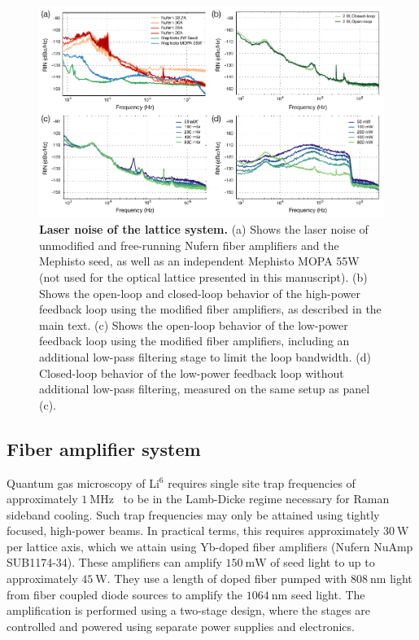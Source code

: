 \documentclass[twocolumn,aps,pra,showpacs,preprintnumbers,bibnotes]{revtex4-1}
\newcommand\unit[2]{\ensuremath{#1~\mathrm{{#2}}}}
\begin{document}
\begin{figure}
  \begin{center}
    \includegraphics{Figure2.pdf}
    \caption{\textbf{Laser noise of the lattice system.} (a) Shows the laser noise of unmodified and free-running Nufern fiber amplifiers and the Mephisto seed, as well as an independent Mephisto MOPA 55W (not used for the optical lattice presented in this manuscript). (b) Shows the open-loop and closed-loop behavior of the high-power feedback loop using the  modified fiber amplifiers, as described in the main text. (c) Shows the open-loop behavior of the low-power feedback loop using the modified fiber amplifiers, including an additional low-pass filtering stage to limit the loop bandwidth. (d) Closed-loop behavior of the low-power feedback loop without additional low-pass filtering, measured on the same setup as panel (c).}\label{fig:noises}
  \end{center}
\end{figure}

\subsection{Fiber amplifier system}
Quantum gas microscopy of Li$^6$ requires single site trap frequencies of approximately \unit{1}{MHz}~\cite{Parsons2015} to be in the Lamb-Dicke regime necessary for Raman sideband cooling.
Such trap frequencies may only be attained using tightly focused, high-power beams.
In practical terms, this requires approximately \unit{30}{W} per lattice axis, which we attain using Yb-doped fiber amplifiers (Nufern NuAmp SUB1174-34).
These amplifiers can amplify \unit{150}{mW} of seed light to up to approximately \unit{45}{W}. They use a length of doped fiber pumped with \unit{808}{nm} light from fiber coupled diode sources to amplify the \unit{1064}{nm} seed light.
The amplification is performed using a two-stage design, where the stages are controlled and powered using separate power supplies and electronics.
\end{document}
